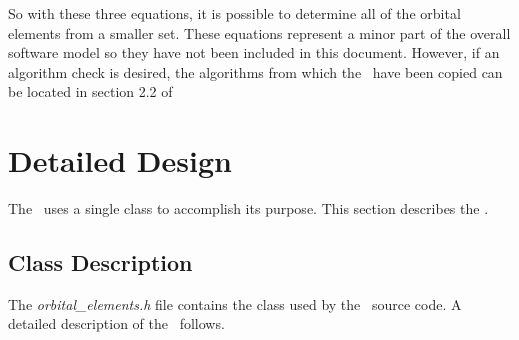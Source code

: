 So with these three equations, it is possible to determine all of the orbital
elements from a smaller set.  These equations represent a minor part of the
overall software model so they have not been included in this document.
However, if an algorithm check is desired, the algorithms from which the
\OrbitalElement\ have been copied can be located in section 2.2 of
\cite{Vallado}


\section{Detailed Design}
The \OrbitalElementDesc\ uses a single class to accomplish its purpose.  This
section describes the \OrbitalElement.
\subsection{Class Description}
The {\em orbital\_elements.h} file contains the class
used by the \OrbitalElementDesc\ source code.
A detailed description of the \OrbitalElement\ follows.

